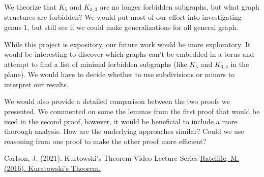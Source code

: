 \documentclass[12pt]{article}
\theoremstyle{definition}
\begin{document}
We theorize that $K_5$ and $K_{3,3}$ are no longer forbidden subgraphs, but what graph structures are forbidden? We would put most of our effort into investigating genus $1$, but still see if we could make generalizations for all general graph.

While this project is expository, our future work would be more exploratory. It would be interesting to discover which graphs can't be embedded in a torus and attempt to find a list of minimal forbidden subgraphs (like $K_5$ and $K_{3,3}$ in the plane). We would have to decide whether to use subdivisions or minors to interpret our results.

We would also provide a detailed comparison between the two proofs we presented. We commented on some the lemmas from the first proof that would be used in the second proof, however, it would be beneficial to include a more thorough analysis. How are the underlying approaches similar? Could we use reasoning from one proof to make the other proof more efficient?



\begin{thebibliography}{100}
{Carlson, J. (2021). Kurtowski's Theorem Video Lecture Series}
 \href{https://www.math.cmu.edu/~mradclif/teaching/228F16/Kuratowski.pdf}{Ratcliffe, M. (2016). Kuratowski’s Theorem.}


\end{thebibliography}
\end{document}
